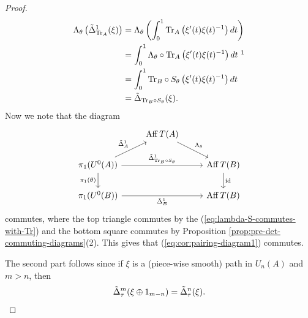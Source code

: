 \documentclass[12pt]{amsart}
\begin{document}
\begin{cor}
\begin{proof}
\begin{equation}
\begin{split}
\Lambda_\theta\left(\tD_{\Tr_A}^1(\xi)\right) &= \Lambda_\theta\left(\int_0^1 \Tr_A\left(\xi'(t)\xi(t)^{-1}\right)dt\right) \\
&= \int_0^1 \Lambda_\theta \circ \Tr_A\left(\xi'(t)\xi(t)^{-1}\right)dt\ \footnotemark \\
&= \int_0^1 \Tr_B \circ S_\theta\left(\xi'(t)\xi(t)^{-1}\right)dt \\
&= \tD_{\Tr_B \circ S_\theta}(\xi).
\end{split}
\end{equation}
Now we note that the diagram
\begin{equation}
\begin{tikzcd}
                                                                                                           & \Aff T(A) \arrow[rd, "\Lambda_\theta"] &                            \\
\pi_1(U^0(A)) \arrow[ru, "\tD_A^1"] \arrow[d, "\pi_1(\theta)"'] \arrow[rr, "\tD_{\Tr_B \circ S_\theta}^1"] &                                        & \Aff T(B) \arrow[d, "\id"] \\
\pi_1(U^0(B)) \arrow[rr, "\tD_B^1"']                                                                       &                                        & \Aff T(B)                 
\end{tikzcd}
\end{equation}
commutes, where the top triangle commutes by the (\ref{eq:lambda-S-commutes-with-Tr}) and the bottom square commutes by Proposition \ref{prop:pre-det-commuting-diagrams}(2). This gives that (\ref{eq:cor:pairing-diagram1}) commutes.

The second part follows since if $\xi$ is a (piece-wise smooth) path in $U_n(A)$ and $m > n$, then
\begin{equation}
\tilde{\Delta}_\tau^m(\xi \oplus 1_{m-n}) = \tilde{\Delta}_\tau^n(\xi).
\end{equation}
\end{proof}
\end{cor}
\end{document}
